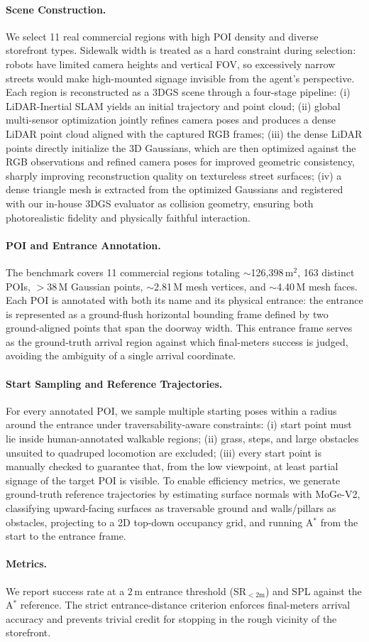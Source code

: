\paragraph{Scene Construction.}
We select 11 real commercial regions with high POI density and
diverse storefront types. Sidewalk width is treated as a hard
constraint during selection: robots have limited camera
heights and vertical FOV, so excessively narrow streets
would make high-mounted signage invisible from the agent's
perspective. Each region is reconstructed as a 3DGS scene through
a four-stage pipeline: (i) LiDAR-Inertial SLAM yields an initial
trajectory and point cloud; (ii) global multi-sensor optimization
jointly refines camera poses and produces a dense LiDAR point
cloud aligned with the captured RGB frames; (iii) the dense
LiDAR points directly initialize the 3D Gaussians, which are then
optimized against the RGB observations and refined camera poses
for improved geometric consistency, sharply improving
reconstruction quality on textureless street surfaces; (iv) a
dense triangle mesh is extracted from the optimized Gaussians and
registered with our in-house 3DGS evaluator as collision
geometry, ensuring both photorealistic fidelity and physically
faithful interaction.

\paragraph{POI and Entrance Annotation.}
The benchmark covers 11 commercial regions totaling
$\sim$126{,}398\,m$^2$, 163 distinct POIs, $>$38\,M Gaussian
points, $\sim$2.81\,M mesh vertices, and $\sim$4.40\,M mesh faces.
Each POI is annotated with both its name and its physical
entrance: the entrance is represented as a ground-flush horizontal
bounding frame defined by two ground-aligned points that span the
doorway width. This entrance frame serves as the ground-truth
arrival region against which final-meters success is judged,
avoiding the ambiguity of a single arrival coordinate.

\paragraph{Start Sampling and Reference Trajectories.}
For every annotated POI, we sample multiple starting poses within a
radius around the entrance under traversability-aware constraints:
(i) start point must lie inside human-annotated walkable regions;
(ii) grass, steps, and large obstacles unsuited to quadruped
locomotion are excluded; (iii) every start point is manually checked to
guarantee that, from the low viewpoint, at least
partial signage of the target POI is visible. To enable efficiency
metrics, we generate ground-truth reference trajectories by
estimating surface normals with MoGe-V2, classifying upward-facing
surfaces as traversable ground and walls/pillars as obstacles,
projecting to a 2D top-down occupancy grid, and running A$^{\!*}$
from the start to the entrance frame.

\paragraph{Metrics.}
We report success rate at a $2$\,m entrance threshold (SR$_{<2\mathrm{m}}$)
and SPL against the A$^{\!*}$ reference. The strict
entrance-distance criterion enforces final-meters arrival accuracy
and prevents trivial credit for stopping in the rough vicinity of
the storefront.
